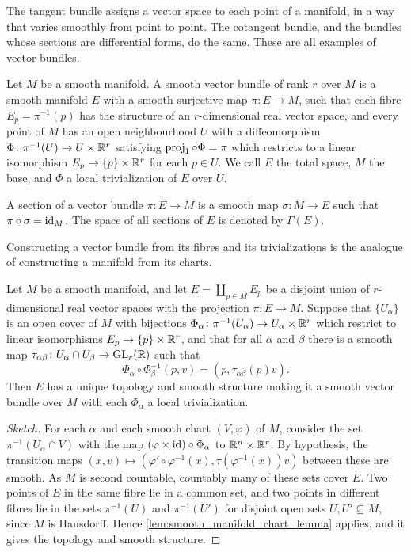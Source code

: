 \documentclass[a4paper,12pt]{article}
\begin{document}
The tangent bundle assigns a vector space to each point of a manifold, in a way that varies smoothly from point to point.
The cotangent bundle, and the bundles whose sections are differential forms, do the same.
These are all examples of vector bundles.
\begin{definition}\label{def:vector_bundle}
    Let $M$ be a smooth manifold.
    A smooth vector bundle of rank $r$ over $M$ is a smooth manifold $E$ with a smooth surjective map $\pi \colon E \to M$, such that each fibre $E_p = \pi^{-1}(p)$ has the structure of an $r$-dimensional real vector space, and every point of $M$ has an open neighbourhood $U$ with a diffeomorphism $\Phi \colon \pi^{-1}(U) \to U \times \mathbb{R}^r$ satisfying $\operatorname{proj}_1 \circ \Phi = \pi$ which restricts to a linear isomorphism $E_p \to \{p\} \times \mathbb{R}^r$ for each $p \in U$.
    We call $E$ the total space, $M$ the base, and $\Phi$ a local trivialization of $E$ over $U$.
\end{definition}
\begin{definition}[Section]\label{def:section}
    A section of a vector bundle $\pi \colon E \to M$ is a smooth map $\sigma \colon M \to E$ such that $\pi \circ \sigma = \operatorname{id}_M$.
    The space of all sections of $E$ is denoted by $\Gamma(E)$.
\end{definition}
Constructing a vector bundle from its fibres and its trivializations is the analogue of constructing a manifold from its charts.
\begin{lemma}\label{lem:vector_bundle_construction_lemma}
    Let $M$ be a smooth manifold, and let $E = \coprod_{p \in M} E_p$ be a disjoint union of $r$-dimensional real vector spaces with the projection $\pi \colon E \to M$.
    Suppose that $\{U_\alpha\}$ is an open cover of $M$ with bijections $\Phi_\alpha \colon \pi^{-1}(U_\alpha) \to U_\alpha \times \mathbb{R}^r$ which restrict to linear isomorphisms $E_p \to \{p\} \times \mathbb{R}^r$, and that for all $\alpha$ and $\beta$ there is a smooth map $\tau_{\alpha\beta} \colon U_\alpha \cap U_\beta \to \mathrm{GL}_r(\mathbb{R})$ such that
    \begin{equation}
        \Phi_\alpha \circ \Phi_\beta^{-1}(p, v) = (p, \tau_{\alpha\beta}(p) v).
    \end{equation}
    Then $E$ has a unique topology and smooth structure making it a smooth vector bundle over $M$ with each $\Phi_\alpha$ a local trivialization.
\end{lemma}
\begin{proof}[Sketch]
    For each $\alpha$ and each smooth chart $(V, \varphi)$ of $M$, consider the set $\pi^{-1}(U_\alpha \cap V)$ with the map $(\varphi \times \operatorname{id}) \circ \Phi_\alpha$ to $\mathbb{R}^n \times \mathbb{R}^r$.
    By hypothesis, the transition maps $(x, v) \mapsto (\varphi' \circ \varphi^{-1}(x), \tau(\varphi^{-1}(x)) v)$ between these are smooth.
    As $M$ is second countable, countably many of these sets cover $E$.
    Two points of $E$ in the same fibre lie in a common set, and two points in different fibres lie in the sets $\pi^{-1}(U)$ and $\pi^{-1}(U')$ for disjoint open sets $U, U' \subseteq M$, since $M$ is Hausdorff.
    Hence \cref{lem:smooth_manifold_chart_lemma} applies, and it gives the topology and smooth structure.
\end{proof}
\end{document}

